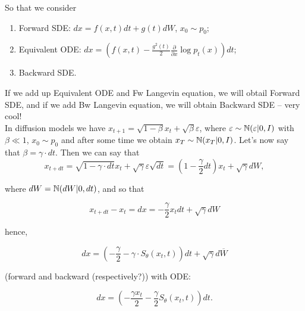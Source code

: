 So that we consider

\begin{enumerate}
    \item Forward SDE: $dx = f(x, t) dt + g(t) dW$, $x_0 \sim p_0$; 
    \item Equivalent ODE: $dx = \left( f(x, t) - \frac{g^2(t)}{2} \frac{\partial}{\partial x} \log p_t(x) \right) dt$; 
    \item Backward SDE. 
\end{enumerate}

If we add up Equivalent ODE and Fw Langevin equation, we will obtail Forward SDE, and if we add Bw Langevin equation, we will obtain Backward SDE -- very cool! \\ 

In diffusion models we have $x_{t + 1} = \sqrt{1 - \beta} x_t + \sqrt{\beta} \varepsilon$, where $\varepsilon \sim \operatorname{\mathbb{N}}(\varepsilon \vert 0, I)$ with $\beta \ll 1$, $x_0 \sim p_0$ and after some time we obtain $x_T \sim \operatorname{\mathbb{N}}(x_T \vert 0, I)$. Let's now say that $\beta = \gamma \cdot dt$. Then we can say that $$x_{t + dt} = \sqrt{1 - \gamma \cdot dt} x_t + \sqrt{\gamma} \varepsilon \sqrt{dt} = \left(1 - \frac{\gamma}{2} dt \right) x_t + \sqrt{\gamma} dW,$$

where $dW = \operatorname{\mathbb{N}} (dW \vert 0, dt)$, and so that 

\[ 
    x_{t + dt} - x_t = dx = -\frac{\gamma}{2} x_t dt + \sqrt{\gamma} dW
\]

hence, 

\[ 
    dx = \left( -\frac{\gamma}{2} - \gamma \cdot S_\theta (x_t, t) \right) dt + \sqrt{\gamma} d \overline{W}
\]

(forward and backward (respectively?)) with ODE: 

\[ 
    dx = \left( - \frac{\gamma x_t}{2} - \frac{\gamma}{2} S_\theta (x_t, t) \right) dt. 
\]